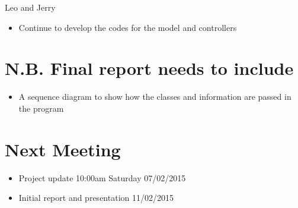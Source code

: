 \documentclass{article}
\begin{document}
\noindent
Leo and Jerry
\begin{itemize}
\item Continue to develop the codes for the model and controllers
\end{itemize}


\section {N.B. Final report needs to include}
\begin{itemize}
\item A sequence diagram to show how the classes and information are passed in the program 
\end{itemize}


\section {Next Meeting}
\begin{itemize}
\item Project update 10:00am Saturday 07/02/2015
\item Initial report and presentation  11/02/2015
\end{itemize}
\end{document}
